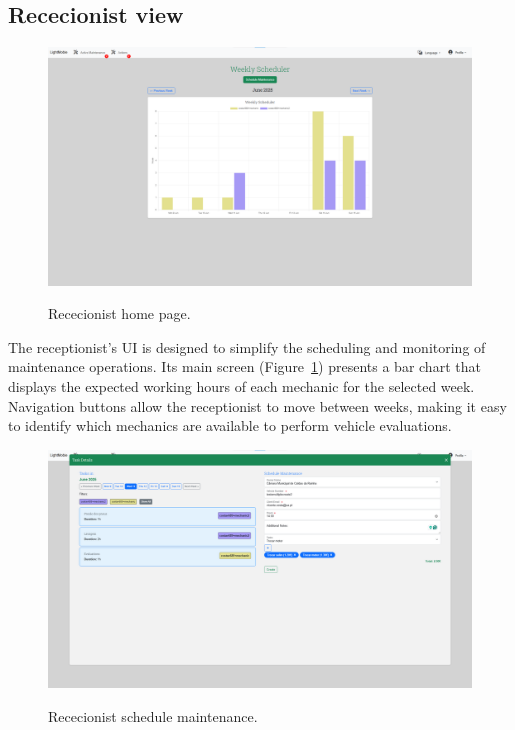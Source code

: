 \subsection{Rececionist view}



\begin{figure}[h]
  \caption{Rececionist home page.}
  \centering
  \includegraphics[width=\textwidth]{figs/Implementation/rececionist/rececionistHomePage}
  \label{fig:impReceHome}
\end{figure}

The receptionist's \ac{UI} is designed to simplify the scheduling and monitoring of maintenance operations. Its main screen (Figure~\ref{fig:impReceHome}) presents a bar chart that displays the expected working hours of each mechanic for the selected week. Navigation buttons allow the receptionist to move between weeks, making it easy to identify which mechanics are available to perform vehicle evaluations. 


\begin{figure}[h]
  \caption{Rececionist schedule maintenance.}
  \centering
  \includegraphics[width=\textwidth]{figs/Implementation/rececionist/addTask}
  \label{fig:impReceAddTask}
\end{figure}

